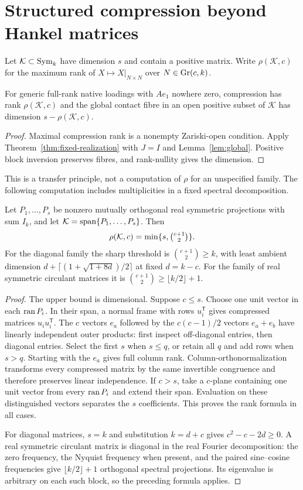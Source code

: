 \section{Structured compression beyond Hankel matrices}\label{sec:structured}
Let $\mathcal K\subset\operatorname{Sym}_k$ have dimension $s$ and contain a positive matrix. Write $\rho(\mathcal K,c)$ for the maximum rank of $X\mapsto X|_{N\times N}$ over $N\in\operatorname{Gr}(c,k)$.
\begin{proposition}\label{prop:transfer}
For generic full-rank native loadings with $Ae_1$ nowhere zero, compression has rank $\rho(\mathcal K,c)$ and the global contact fibre in an open positive subset of $\mathcal K$ has dimension $s-\rho(\mathcal K,c)$.
\end{proposition}
\begin{proof}
Maximal compression rank is a nonempty Zariski-open condition. Apply Theorem~\ref{thm:fixed-realization} with $J=I$ and Lemma~\ref{lem:global}. Positive block inversion preserves fibres, and rank-nullity gives the dimension.
\end{proof}
This is a transfer principle, not a computation of $\rho$ for an unspecified family. The following computation includes multiplicities in a fixed spectral decomposition.
\begin{theorem}\label{thm:spectral}
Let $P_1,\ldots,P_s$ be nonzero mutually orthogonal real symmetric projections with sum $I_k$, and let $\mathcal K=\operatorname{span}\{P_1,\ldots,P_s\}$. Then
\[
 \rho(\mathcal K,c)=\min\{s,\tbinom{c+1}{2}\}.
\]
For the diagonal family the sharp threshold is $\binom{c+1}{2}\ge k$, with least ambient dimension $d+\lceil(1+\sqrt{1+8d})/2\rceil$ at fixed $d=k-c$. For the family of real symmetric circulant matrices it is $\binom{c+1}{2}\ge\lfloor k/2\rfloor+1$.
\end{theorem}
\begin{proof}
The upper bound is dimensional. Suppose $c\le s$. Choose one unit vector in each $\operatorname{ran} P_i$. In their span, a normal frame with rows $u_i^{\mathsf T}$ gives compressed matrices $u_iu_i^{\mathsf T}$. The $c$ vectors $e_a$ followed by the $c(c-1)/2$ vectors $e_a+e_b$ have linearly independent outer products: first inspect off-diagonal entries, then diagonal entries. Select the first $s$ when $s\le q$, or retain all $q$ and add rows when $s>q$. Starting with the $e_a$ gives full column rank. Column-orthonormalization transforms every compressed matrix by the same invertible congruence and therefore preserves linear independence. If $c>s$, take a $c$-plane containing one unit vector from every $\operatorname{ran} P_i$ and extend their span. Evaluation on these distinguished vectors separates the $s$ coefficients. This proves the rank formula in all cases.

For diagonal matrices, $s=k$ and substitution $k=d+c$ gives $c^2-c-2d\ge0$. A real symmetric circulant matrix is diagonal in the real Fourier decomposition: the zero frequency, the Nyquist frequency when present, and the paired sine--cosine frequencies give $\lfloor k/2\rfloor+1$ orthogonal spectral projections. Its eigenvalue is arbitrary on each such block, so the preceding formula applies.
\end{proof}
